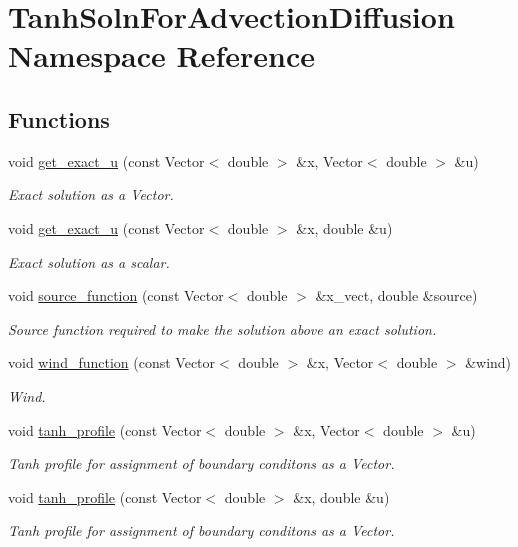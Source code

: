 \hypertarget{namespaceTanhSolnForAdvectionDiffusion}{}\section{Tanh\+Soln\+For\+Advection\+Diffusion Namespace Reference}
\label{namespaceTanhSolnForAdvectionDiffusion}
\subsection*{Functions}
\begin{DoxyCompactItemize}
\item 
void \hyperlink{namespaceTanhSolnForAdvectionDiffusion_ae4c9ed0a4f123ec8e634f0cc45bfcebc}{get\+\_\+exact\+\_\+u} (const Vector$<$ double $>$ \&x, Vector$<$ double $>$ \&u)
\begin{DoxyCompactList}\small\item\em Exact solution as a Vector. \end{DoxyCompactList}\item 
void \hyperlink{namespaceTanhSolnForAdvectionDiffusion_af302dc41c1e494b3430fe6654bd1fd39}{get\+\_\+exact\+\_\+u} (const Vector$<$ double $>$ \&x, double \&u)
\begin{DoxyCompactList}\small\item\em Exact solution as a scalar. \end{DoxyCompactList}\item 
void \hyperlink{namespaceTanhSolnForAdvectionDiffusion_aaa1aa95713b02b211812fdd18eeaa369}{source\+\_\+function} (const Vector$<$ double $>$ \&x\+\_\+vect, double \&source)
\begin{DoxyCompactList}\small\item\em Source function required to make the solution above an exact solution. \end{DoxyCompactList}\item 
void \hyperlink{namespaceTanhSolnForAdvectionDiffusion_ab40e93031d34986762c69616c3c8b065}{wind\+\_\+function} (const Vector$<$ double $>$ \&x, Vector$<$ double $>$ \&wind)
\begin{DoxyCompactList}\small\item\em Wind. \end{DoxyCompactList}\item 
void \hyperlink{namespaceTanhSolnForAdvectionDiffusion_a4016f2f5bd0c82061bee09043dc8e8e6}{tanh\+\_\+profile} (const Vector$<$ double $>$ \&x, Vector$<$ double $>$ \&u)
\begin{DoxyCompactList}\small\item\em Tanh profile for assignment of boundary conditons as a Vector. \end{DoxyCompactList}\item 
void \hyperlink{namespaceTanhSolnForAdvectionDiffusion_afee88c1e0f93cc56d06c2e94aaf8449c}{tanh\+\_\+profile} (const Vector$<$ double $>$ \&x, double \&u)
\begin{DoxyCompactList}\small\item\em Tanh profile for assignment of boundary conditons as a Vector. \end{DoxyCompactList}\end{DoxyCompactItemize}

